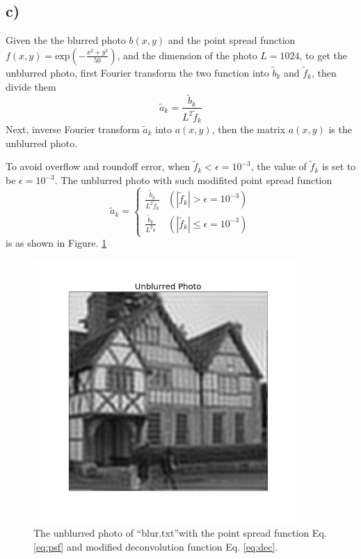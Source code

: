 \documentclass[12pt, graphicx]{article}
\begin{document}
\subsection*{c)}
Given the the blurred photo $b(x,y)$ and the point spread function $f(x,y)=\mathrm{exp}\left(-\frac{x^2+y^2}{50}\right)$, and the dimension of the photo $L=1024$, to get the unblurred photo, first Fourier transform the two function into $\tilde{b}_k$ and $\tilde{f}_k$, then divide them 
\begin{equation}
\tilde{a}_k=\frac{\tilde{b}_k}{L^2\tilde{f}_k}
\end{equation}
Next, inverse Fourier transform $\tilde{a}_k$ into $a(x,y)$, then the matrix $a(x,y)$ is the unblurred photo. \par
To avoid overflow and roundoff error, when $\tilde{f}_k<\epsilon=10^{-3}$, the value of $\tilde{f}_k$ is set to be $\epsilon=10^{-3}$. The unblurred photo with such modifited point spread function
\begin{equation}
\displaystyle\tilde{a}_k=
\begin{cases}
\displaystyle\frac{\tilde{b}_k}{L^2\tilde{f}_k} & (|\tilde{f}_k|>\epsilon=10^{-3}) \\
\displaystyle\frac{\tilde{b}_k}{L^2\epsilon} & (|\tilde{f}_k|\leqslant\epsilon=10^{-3})
\end{cases}
\label{eq:dec}
\end{equation}
is as shown in Figure. \ref{fig:unblur}

\begin{figure}[ht]
\centering
\includegraphics[width = 100mm]{unblurred.png}
\caption{The unblurred photo of \textquotedblleft blur.txt\textquotedblright with the point spread function Eq. \ref{eq:psf} and modified deconvolution function Eq. \ref{eq:dec}.}
\label{fig:unblur}
\end{figure}
\end{document}
